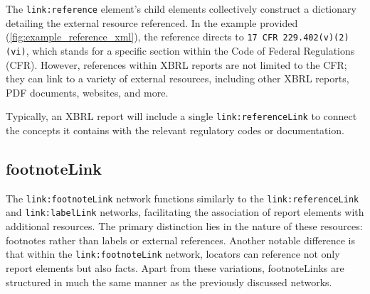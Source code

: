 The \texttt{link:reference} element's child elements collectively construct a dictionary detailing the external resource referenced.  
In the example provided (\ref{fig:example_reference_xml}), the reference directs to \texttt{17 CFR 229.402(v)(2)(vi)}\cite{cfr_229_402_17},  
which stands for a specific section within the Code of Federal Regulations (CFR).  
However, references within XBRL reports are not limited to the CFR; they can link to a variety of external resources, including other XBRL reports, PDF documents, websites, and more.

Typically, an XBRL report will include a single \texttt{link:referenceLink} to connect the concepts it contains with the relevant regulatory codes or documentation.

\subsection{footnoteLink}

The \texttt{link:footnoteLink} network functions similarly to the \texttt{link:referenceLink} and \texttt{link:labelLink} networks, facilitating the association of report elements with additional resources.  
The primary distinction lies in the nature of these resources: footnotes rather than labels or external references.  
Another notable difference is that within the \texttt{link:footnoteLink} network, locators can reference not only report elements but also facts.  
Apart from these variations, footnoteLinks are structured in much the same manner as the previously discussed networks.